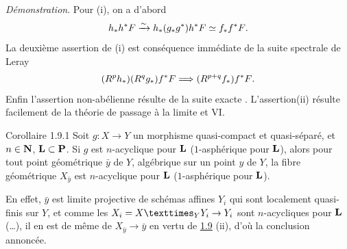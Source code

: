 \documentclass[10pt]{../fichiers-configuration-latex/smfart}
\begin{document}
\noindent
\emph{Démonstration}. Pour (i), on a d'abord
$$
h_{\ast}h^{\ast}F\xrightarrow{\sim}
h_{\ast}(g_{\ast}g^{\ast})h^{\ast}F\simeq f_{\ast}f^{\ast}F{}.
$$
La deuxième assertion de (i) est conséquence immédiate de la suite
spectrale de Leray
$$
(R^{p}h_{\ast})(R^{q}g_{\ast})f^{\ast}F\Longrightarrow
(R^{p+q}f_{\ast})f^{\ast}F{}.
$$
Enfin l'assertion non-abélienne résulte de la suite exacte .
L'assertion\pageoriginale (ii) résulte facilement de la théorie
de passage à la limite  et VI. %

\begin{enonce*}{Corollaire 1.9.1}
Soit $g:X\rightarrow Y$ un morphisme quasi-compact et quasi-séparé, et
$n\in \mathbf{N}$, $\mathbf{L}\subset \mathbf{P}$. Si $g$ est
$n$-acyclique pour $\mathbf{L}$ (\resp $1$-asphérique pour
$\mathbf{L}$), alors pour tout point géométrique $\bar{y}$ de $Y$,
algébrique sur un point $y$ de $Y$, la fibre géométrique $X_{\bar{y}}$
est $n$-acyclique pour $\mathbf{L}$ (\resp $1$-asphérique pour $\mathbf{L}$).
\end{enonce*}

En effet, $\bar{y}$ est limite projective de schémas affines $Y_i$ qui
sont localement quasi-finis sur $Y$, et comme les
$X_i=\fprod{X}{Y_i}{Y}\rightarrow Y_i$ sont $n$-acycliques pour
$\mathbf{L}$ (\resp\ldots), il en est de même de
$X_{\bar{y}}\rightarrow \bar{y}$ en vertu de \hyperref[XV.prop1.9]{1.9} (ii), d'où la
conclusion annoncée.
\end{document}
